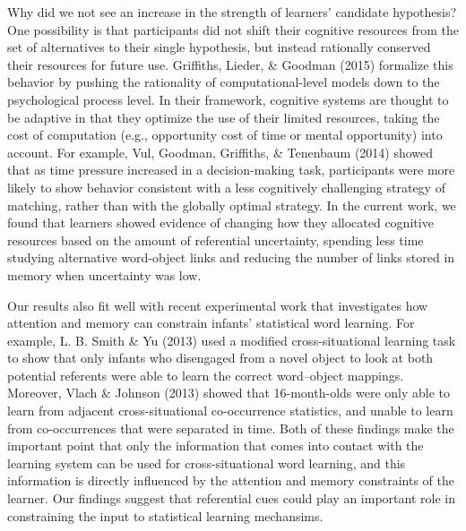 \documentclass[authoryear, review]{elsarticle}
\begin{document}
Why did we not see an increase in the strength of learners' candidate
hypothesis? One possibility is that participants did not shift their
cognitive resources from the set of alternatives to their single
hypothesis, but instead rationally conserved their resources for future
use. Griffiths, Lieder, \& Goodman (2015) formalize this behavior by
pushing the rationality of computational-level models down to the
psychological process level. In their framework, cognitive systems are
thought to be adaptive in that they optimize the use of their limited
resources, taking the cost of computation (e.g., opportunity cost of
time or mental opportunity) into account. For example, Vul, Goodman,
Griffiths, \& Tenenbaum (2014) showed that as time pressure increased in
a decision-making task, participants were more likely to show behavior
consistent with a less cognitively challenging strategy of matching,
rather than with the globally optimal strategy. In the current work, we
found that learners showed evidence of changing how they allocated
cognitive resources based on the amount of referential uncertainty,
spending less time studying alternative word-object links and reducing
the number of links stored in memory when uncertainty was low.

Our results also fit well with recent experimental work that
investigates how attention and memory can constrain infants' statistical
word learning. For example, L. B. Smith \& Yu (2013) used a modified
cross-situational learning task to show that only infants who disengaged
from a novel object to look at both potential referents were able to
learn the correct word--object mappings. Moreover, Vlach \& Johnson
(2013) showed that 16-month-olds were only able to learn from adjacent
cross-situational co-occurrence statistics, and unable to learn from
co-occurrences that were separated in time. Both of these findings make
the important point that only the information that comes into contact
with the learning system can be used for cross-situational word
learning, and this information is directly influenced by the attention
and memory constraints of the learner. Our findings suggest that
referential cues could play an important role in constraining the input
to statistical learning mechansims.
\end{document}
